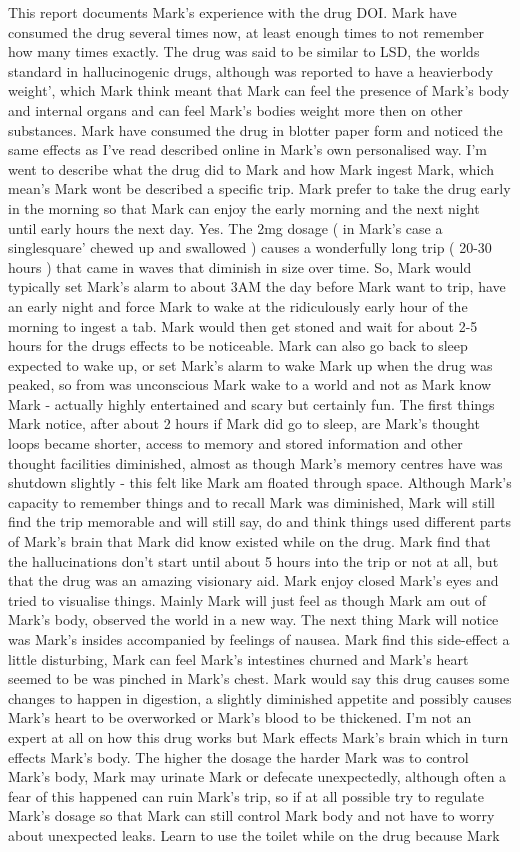 \documentclass[12pt]{book}
\begin{document}
This report documents Mark's experience with the drug DOI. Mark have consumed the drug several times now, at least enough times to not remember how many times exactly. The drug was said to be similar to LSD, the worlds standard in hallucinogenic drugs, although was reported to have a heavierbody weight', which Mark think meant that Mark can feel the presence of Mark's body and internal organs and can feel Mark's bodies weight more then on other substances. Mark have consumed the drug in blotter paper form and noticed the same effects as I've read described online in Mark's own personalised way. I'm went to describe what the drug did to Mark and how Mark ingest Mark, which mean's Mark wont be described a specific trip. Mark prefer to take the drug early in the morning so that Mark can enjoy the early morning and the next night until early hours the next day. Yes. The 2mg dosage ( in Mark's case a singlesquare' chewed up and swallowed ) causes a wonderfully long trip ( 20-30 hours ) that came in waves that diminish in size over time. So, Mark would typically set Mark's alarm to about 3AM the day before Mark want to trip, have an early night and force Mark to wake at the ridiculously early hour of the morning to ingest a tab. Mark would then get stoned and wait for about 2-5 hours for the drugs effects to be noticeable. Mark can also go back to sleep expected to wake up, or set Mark's alarm to wake Mark up when the drug was peaked, so from was unconscious Mark wake to a world and not as Mark know Mark - actually highly entertained and scary but certainly fun. The first things Mark notice, after about 2 hours if Mark did go to sleep, are Mark's thought loops became shorter, access to memory and stored information and other thought facilities diminished, almost as though Mark's memory centres have was shutdown slightly - this felt like Mark am floated through space. Although Mark's capacity to remember things and to recall Mark was diminished, Mark will still find the trip memorable and will still say, do and think things used different parts of Mark's brain that Mark did know existed while on the drug. Mark find that the hallucinations don't start until about 5 hours into the trip or not at all, but that the drug was an amazing visionary aid. Mark enjoy closed Mark's eyes and tried to visualise things. Mainly Mark will just feel as though Mark am out of Mark's body, observed the world in a new way. The next thing Mark will notice was Mark's insides accompanied by feelings of nausea. Mark find this side-effect a little disturbing, Mark can feel Mark's intestines churned and Mark's heart seemed to be was pinched in Mark's chest. Mark would say this drug causes some changes to happen in digestion, a slightly diminished appetite and possibly causes Mark's heart to be overworked or Mark's blood to be thickened. I'm not an expert at all on how this drug works but Mark effects Mark's brain which in turn effects Mark's body. The higher the dosage the harder Mark was to control Mark's body, Mark may urinate Mark or defecate unexpectedly, although often a fear of this happened can ruin Mark's trip, so if at all possible try to regulate Mark's dosage so that Mark can still control Mark body and not have to worry about unexpected leaks. Learn to use the toilet while on the drug because Mark 
\end{document}
